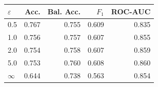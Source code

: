 \begin{tabular}{lrrrr}
\toprule
$\varepsilon$ & Acc. & Bal. Acc. & $F_1$ & ROC-AUC \\
\midrule
0.5 & 0.767 & 0.755 & 0.609 & 0.835 \\
1.0 & 0.756 & 0.757 & 0.607 & 0.855 \\
2.0 & 0.754 & 0.758 & 0.607 & 0.859 \\
5.0 & 0.753 & 0.760 & 0.608 & 0.860 \\
$\infty$ & 0.644 & 0.738 & 0.563 & 0.854 \\
\bottomrule
\end{tabular}

